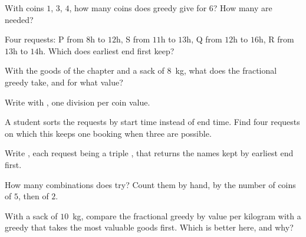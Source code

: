 \begin{exercise}[$\star$]\label{exo:g11:greedy-algorithms:2}
With coins $1$, $3$, $4$, how many coins does greedy give for $6$? How many are needed?
\end{exercise}

\begin{exercise}[$\star$]\label{exo:g11:greedy-algorithms:3}
Four requests: P from $8$h to $12$h, S from $11$h to $13$h, Q from $12$h to $16$h, R from $13$h to $14$h. Which does
earliest end first keep?
\end{exercise}

\begin{exercise}[$\star$]\label{exo:g11:greedy-algorithms:4}
With the goods of the chapter and a sack of $8$~kg, what does the fractional greedy take, and for what value?
\end{exercise}

\begin{exercise}[$\star$]\label{exo:g11:greedy-algorithms:5}
Write  with , one division per coin value.
\end{exercise}

\begin{exercise}[$\star\star$]\label{exo:g11:greedy-algorithms:6}
A student sorts the requests by start time instead of end time. Find four requests on which this keeps one booking
when three are possible.
\end{exercise}

\begin{exercise}[$\star\star$]\label{exo:g11:greedy-algorithms:7}
Write , each request being a triple , that returns the names
kept by earliest end first.
\end{exercise}

\begin{exercise}[$\star\star$]\label{exo:g11:greedy-algorithms:8}
How many combinations does  try? Count them by hand, by the number of coins of $5$, then of
$2$.
\end{exercise}

\begin{exercise}[$\star\star$]\label{exo:g11:greedy-algorithms:9}
With a sack of $10$~kg, compare the fractional greedy by value per kilogram with a greedy that takes the most valuable
goods first. Which is better here, and why?
\end{exercise}

